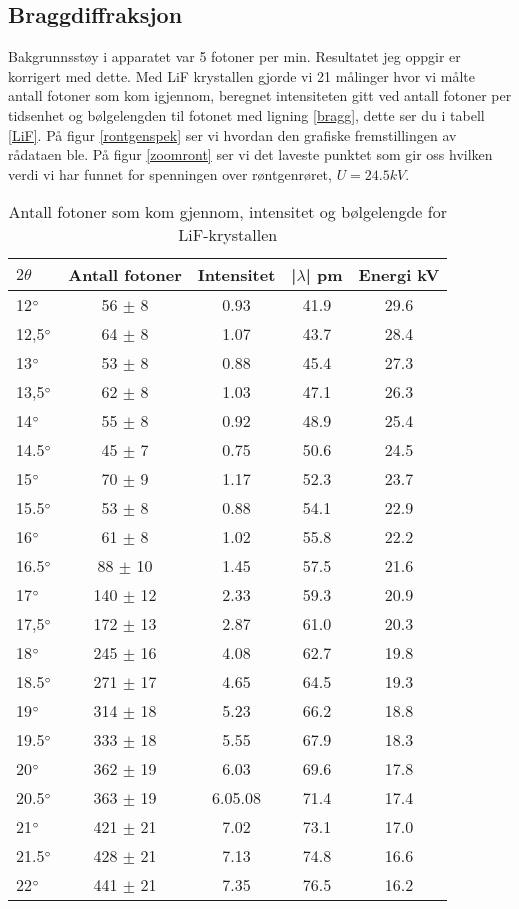 \documentclass[norsk,a4paper,12pt]{article}
\begin{document}
\subsection{Braggdiffraksjon}
Bakgrunnsstøy i apparatet var 5 fotoner per min. Resultatet jeg oppgir er korrigert med dette.
Med LiF krystallen gjorde vi 21 målinger hvor vi målte antall fotoner som kom igjennom, beregnet intensiteten gitt ved antall fotoner per tidsenhet og bølgelengden til fotonet med ligning \ref{bragg}, dette ser du i tabell \vref{LiF}. På figur \vref{rontgenspek} ser vi hvordan den grafiske fremstillingen av rådataen ble. På figur \vref{zoomront} ser vi det laveste punktet som gir oss hvilken verdi vi har funnet for spenningen over røntgenrøret, $U=24.5 kV$.\\
\begin{table}
\centering
\caption[Resultat med LiF-krystallen]{Antall fotoner som kom gjennom, intensitet og bølgelengde for LiF-krystallen }
	\begin{tabular}{|l|c|c|c|c|}
	\hline
	$2\theta$ & Antall fotoner & Intensitet & |$\lambda$| pm & Energi kV \\ 
	\hline
	12$\degree$ & 56 $\pm$ 8& 0.93 & 41.9 & 29.6\\
	12,5$\degree$ & 64 $\pm$ 8 & 1.07 & 43.7 & 28.4 \\
	13$\degree$ & 53 $\pm$ 8& 0.88 & 45.4 & 27.3 \\
	13,5$\degree$ & 62 $\pm$ 8 & 1.03 & 47.1 & 26.3 \\ 
	14$\degree$ & 55  $\pm$ 8 & 0.92 & 48.9 & 25.4 \\
	14.5$\degree$ & 45 $\pm$ 7 & 0.75 & 50.6 & 24.5\\
	15$\degree$ & 70 $\pm$ 9 & 1.17 & 52.3 & 23.7 \\
	15.5$\degree$ & 53 $\pm$ 8 & 0.88 & 54.1 & 22.9 \\
	16$\degree$ & 61 $\pm$ 8 & 1.02 & 55.8 & 22.2 \\
	16.5$\degree$ & 88 $\pm$ 10  & 1.45 & 57.5 & 21.6 \\
	17$\degree$ & 140 $\pm$ 12 & 2.33 & 59.3 & 20.9 \\
	17,5$\degree$ & 172 $\pm$ 13 & 2.87 & 61.0 & 20.3 \\
	18$\degree$ & 245 $\pm$ 16 & 4.08 & 62.7 & 19.8 \\
	18.5$\degree$ & 271 $\pm$ 17 & 4.65 & 64.5 & 19.3 \\
	19$\degree$ & 314 $\pm$ 18 & 5.23 & 66.2 & 18.8 \\
	19.5$\degree$ & 333 $\pm$ 18 & 5.55 & 67.9 & 18.3 \\
	20$\degree$ & 362 $\pm$ 19 & 6.03 & 69.6 & 17.8 \\
	20.5$\degree$ & 363 $\pm$ 19  & 6.05.08 & 71.4 & 17.4  \\
	21$\degree$ & 421 $\pm$ 21 & 7.02 & 73.1 & 17.0 \\
	21.5$\degree$ & 428 $\pm$ 21 & 7.13 & 74.8 & 16.6 \\
	22$\degree$ & 441 $\pm$ 21 & 7.35 & 76.5 & 16.2 \\
	\hline
	\end{tabular}
\label{LiF}
\end{table}
\end{document}

